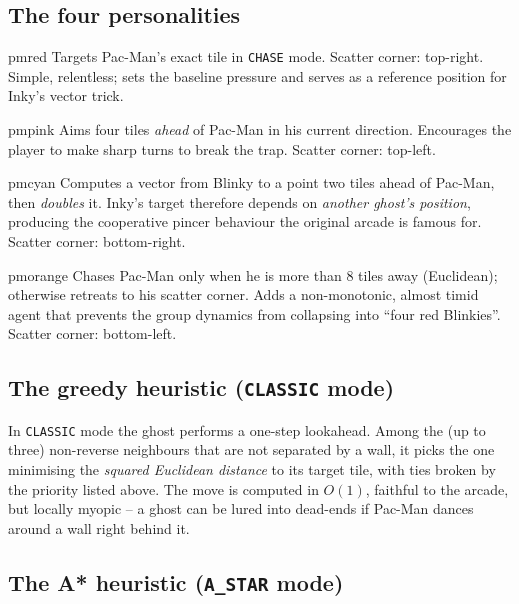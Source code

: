 \documentclass[11pt,a4paper]{article}
\begin{document}
\subsection{The four personalities}

\begin{ghostbox}{pmred}
Targets Pac-Man's exact tile in \texttt{CHASE} mode. Scatter corner:
top-right. Simple, relentless; sets the baseline pressure and serves as
a reference position for Inky's vector trick.
\end{ghostbox}

\begin{ghostbox}{pmpink}
Aims four tiles \emph{ahead} of Pac-Man in his current direction.
Encourages the player to make sharp turns to break the trap. Scatter
corner: top-left.
\end{ghostbox}

\begin{ghostbox}{pmcyan}
Computes a vector from Blinky to a point two tiles ahead of Pac-Man,
then \emph{doubles} it. Inky's target therefore depends on
\emph{another ghost's position}, producing the cooperative pincer
behaviour the original arcade is famous for. Scatter corner:
bottom-right.
\end{ghostbox}

\begin{ghostbox}{pmorange}
Chases Pac-Man only when he is more than 8 tiles away (Euclidean);
otherwise retreats to his scatter corner. Adds a non-monotonic, almost
timid agent that prevents the group dynamics from collapsing into
``four red Blinkies''. Scatter corner: bottom-left.
\end{ghostbox}

\subsection{The greedy heuristic (\texttt{CLASSIC} mode)}

In \texttt{CLASSIC} mode the ghost performs a one-step lookahead.
Among the (up to three) non-reverse neighbours that are not separated by
a wall, it picks the one minimising the \emph{squared Euclidean
distance} to its target tile, with ties broken by the priority listed
above. The move is computed in $O(1)$, faithful to the arcade, but
locally myopic -- a ghost can be lured into dead-ends if Pac-Man dances
around a wall right behind it.

\subsection{The A* heuristic (\texttt{A\_STAR} mode)}
\end{document}
